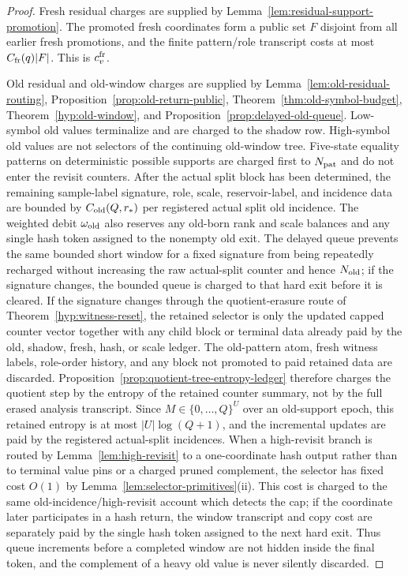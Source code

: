 \documentclass[11pt]{article}
\begin{document}
\begin{proof}
Fresh residual charges are supplied by
Lemma~\ref{lem:residual-support-promotion}.  The promoted fresh coordinates
form a public set $F$ disjoint from all earlier fresh promotions, and the
finite pattern/role transcript costs at most $C_{\rm fr}(q)|F|$.  This is
$c_v^{\rm fr}$.

Old residual and old-window charges are supplied by
Lemma~\ref{lem:old-residual-routing}, Proposition~\ref{prop:old-return-public},
Theorem~\ref{thm:old-symbol-budget}, Theorem~\ref{hyp:old-window}, and
Proposition~\ref{prop:delayed-old-queue}.  Low-symbol old values terminalize
and are charged to the shadow row.  High-symbol old values are not selectors
of the continuing old-window tree.  Five-state equality patterns on
deterministic possible supports are charged first to $N_{\rm pat}$ and do not
enter the revisit counters.  After the actual split block has been determined,
the remaining sample-label signature, role, scale, reservoir-label, and
incidence data are bounded by $C_{\rm old}(Q,r_*)$ per registered actual split
old incidence.  The weighted debit $\omega_{\rm old}$ also reserves any
old-born rank and scale balances and any single hash token assigned to the
nonempty old exit.  The delayed queue prevents the same bounded short window
for a fixed signature from being repeatedly recharged without increasing the
raw actual-split counter and hence $N_{\rm old}$; if the signature changes, the
bounded queue is charged to that hard exit before it is cleared.
If the signature changes through the quotient-erasure route of
Theorem~\ref{hyp:witness-reset}, the retained selector is only the updated
capped counter vector together with any child block or terminal data already
paid by the old, shadow, fresh, hash, or scale ledger.  The old-pattern atom,
fresh witness labels, role-order history, and any block not promoted to paid
retained data are discarded.  Proposition~\ref{prop:quotient-tree-entropy-ledger}
therefore charges the quotient step by the entropy of the retained counter
summary, not by the full erased analysis transcript.  Since
$M\in\{0,\ldots,Q\}^U$ over an old-support epoch, this retained entropy is at
most $|U|\log(Q+1)$, and the incremental updates are paid by the registered
actual-split incidences.
When a high-revisit branch is routed by Lemma~\ref{lem:high-revisit} to a
one-coordinate hash output rather than to terminal value pins or a charged
pruned complement, the selector has fixed cost $O(1)$ by
Lemma~\ref{lem:selector-primitives}(ii).  This cost is charged to the same
old-incidence/high-revisit account which detects the cap; if the coordinate
later participates in a hash return, the window transcript and copy cost are
separately paid by the single hash token assigned to the next hard exit.  Thus
queue increments before a completed window are not hidden inside the final
token, and the complement of a heavy old value is never silently discarded.


\end{proof}
\end{document}
